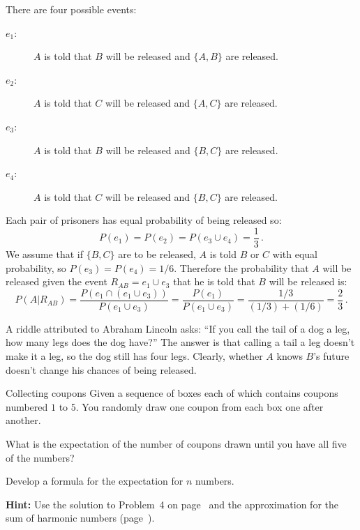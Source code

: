 There are four possible events:
\begin{description}
\item[$e_1$:] $A$ is told that $B$ will be released and $\{A,B\}$ are released. 
\item[$e_2$:] $A$ is told that $C$ will be released and $\{A,C\}$ are released. 
\item[$e_3$:] $A$ is told that $B$ will be released and $\{B,C\}$ are released. 
\item[$e_4$:] $A$ is told that $C$ will be released and $\{B,C\}$ are released. 
\end{description}
Each pair of prisoners has equal probability of being released so:
\[
P(e_1)=P(e_2)=P(e_3\cup e_4)=\frac{1}{3}\,.
\]
We assume that if $\{B,C\}$ are to be released, $A$ is told $B$ or $C$ with equal probability, so $P(e_3)=P(e_4)=1/6$. Therefore the probability that $A$ will be released given the event $R_{AB}=e_1\cup e_3$ that he is told that $B$ will be released is:
\[
P(A|R_{AB}) = \frac{P(e_1\cap(e_1\cup e_3))}{P(e_1\cup e_3)}=\frac{P(e_1)}{P(e_1\cup e_3)}=\frac{1/3}{(1/3)+(1/6)}=\frac{2}{3}\,.
\]


A riddle attributed to Abraham Lincoln asks: ``If you call the tail of a dog a leg, how many legs does the dog have?'' The answer is that calling a tail a leg doesn't make it a leg, so the dog still has four legs. Clearly, whether $A$ knows $B$'s future doesn't change his chances of being released.


\begin{prob}{Collecting coupons}
Given a sequence of boxes each of which contains coupons numbered $1$ to $5$. You randomly draw one coupon from each box one after another.

 What is the expectation of the number of coupons drawn until you have all five of the numbers?

 Develop a formula for the expectation for $n$ numbers.

\textbf{Hint:} Use the solution to Problem~4 on page~\pageref{p.four} and the approximation for the sum of harmonic numbers (page~\pageref{p.harmonic}).
\end{prob}

\solution{}

